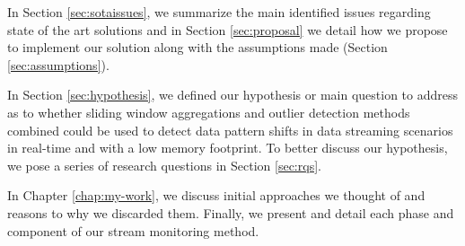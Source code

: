 In Section \ref{sec:sotaissues}, we summarize the main identified issues regarding state of the art solutions and in Section \ref{sec:proposal} we detail how we propose to implement our solution along with the assumptions made (Section \ref{sec:assumptions}).

In Section \ref{sec:hypothesis}, we defined our hypothesis or main question to address as to whether sliding window aggregations and outlier detection methods combined could be used to detect data pattern shifts in data streaming scenarios in real-time and with a low memory footprint. To better discuss our hypothesis, we pose a series of research questions in Section \ref{sec:rqs}.

In Chapter \ref{chap:my-work}, we discuss initial approaches we thought of and reasons to why we discarded them. Finally, we present and detail each phase and component of our stream monitoring method.
